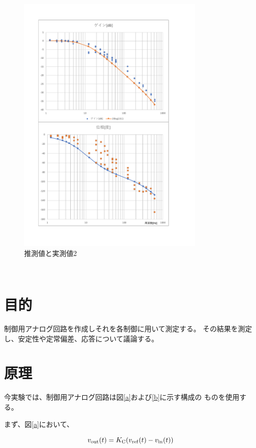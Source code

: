 \documentclass[uplatex, 11pt,a4j, titlepage]{jsarticle}
\begin{document}
\begin{figure}[h]
    \centering
    \includegraphics[width=9cm]{ideal_real2.pdf}
    \caption{推測値と実測値2}
    \label{ideal_real2}
\end{figure}


\newpage
\newpage
\ 
\newpage
\ 
\newpage



\section{目的}
制御用アナログ回路を作成しそれを各制御に用いて測定する。
その結果を測定し、安定性や定常偏差、応答について議論する。

\section{原理}
今実験では、制御用アナログ回路は図\ref{a}および\ref{b}に示す構成の
ものを使用する。

まず、図\ref{a}において、

\begin{equation}\label{twenty_seven}
    v_{\rm out}(t) = K_{\rm C}(v_{\rm ref}(t) - v_{\rm in}(t))
\end{equation}
\end{document}
